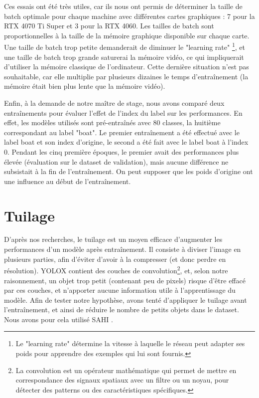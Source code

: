 Ces essais ont été très utiles, car ils nous ont permis de déterminer la taille de batch
optimale \cite{Goodfellow-et-al-2016} pour chaque machine avec différentes cartes graphiques :
7 pour la RTX 4070 Ti Super et 3 pour la RTX 4060.
Les tailles de batch sont proportionnelles à la taille de la mémoire graphique
disponible sur chaque carte. Une taille de batch trop petite demanderait de diminuer le "learning rate"
\footnote{Le "learning rate" détermine la vitesse à laquelle le réseau peut adapter ses poids
pour apprendre des exemples qui lui sont fournis.}, et une taille de batch trop grande
saturerai la mémoire vidéo, ce qui impliquerait d'utiliser la mémoire classique de l'ordinateur.
Cette dernière situation n'est pas souhaitable, car elle multiplie par plusieurs dizaines
le temps d'entraînement (la mémoire était bien plus lente que la mémoire vidéo).

Enfin, à la demande de notre maître de stage, nous avons comparé deux entraînements pour évaluer
l'effet de l'index du label sur les performances.
En effet, les modèles utilisés sont pré-entraînés avec 80 classes, la huitième correspondant
au label "boat". Le premier entraînement a été effectué avec le label boat et son index d'origine,
le second a été fait avec le label boat à l'index 0.
Pendant les cinq première époques, le premier avait des performances plus élevée (évaluation sur
le dataset de validation), mais aucune différence ne subsistait à la fin de l'entraînement.
On peut supposer que les poids d'origine ont une influence au début de l'entraînement.


\section{Tuilage}

D'après nos recherches, le tuilage est un moyen efficace d'augmenter les performances d'un modèle après
entraînement. Il consiste à diviser l'image en plusieurs parties, afin d'éviter d'avoir à la compresser
(et donc perdre en résolution).
YOLOX contient des couches de convolution\footnote{La convolution est un opérateur mathématique
qui permet de mettre en correspondance des signaux spatiaux avec un filtre ou un noyau,
pour détecter des patterns ou des caractéristiques spécifiques.}, et, selon notre raisonnement,
un objet trop petit (contenant peu de pixels) risque d'être effacé par ces couches, et n'apporter
aucune information utile à l'apprentissage du modèle.
Afin de tester notre hypothèse, avons tenté d'appliquer le tuilage avant l'entraînement,
et ainsi de réduire le nombre de petits objets dans le dataset.
Nous avons pour cela utilisé SAHI \cite{Akyon_Altinuc_Temizel_2022}.

